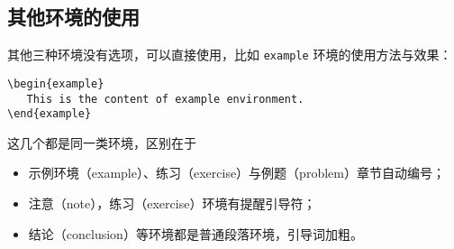 \documentclass[cn,10pt,math=newtx,citestyle=gb7714-2015,bibstyle=gb7714-2015]{elegantbook}
\begin{document}
\subsection{其他环境的使用}

其他三种环境没有选项，可以直接使用，比如 \lstinline{example} 环境的使用方法与效果：
\begin{lstlisting}
\begin{example}
   This is the content of example environment.
\end{example}
\end{lstlisting}

这几个都是同一类环境，区别在于

\begin{itemize}
  \item 示例环境（example）、练习（exercise）与例题（problem）章节自动编号；
  \item 注意（note），练习（exercise）环境有提醒引导符；
  \item 结论（conclusion）等环境都是普通段落环境，引导词加粗。
\end{itemize}
\end{document}
